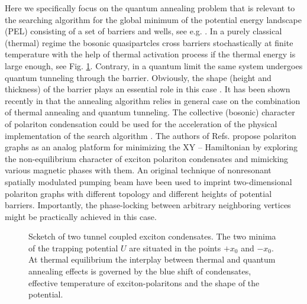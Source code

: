 \documentclass[fleqn,10pt]{wlscirep}
\begin{document}
Here we specifically focus on the quantum annealing problem that is relevant to the searching algorithm for the global minimum of the potential energy landscape (PEL) consisting of a set of barriers and wells, see e.g.  \cite{Santoro, Das}.
In a purely classical  (thermal) regime the {bosonic quasipartcles cross barriers stochastically} at finite temperature with the help of thermal activation process if the thermal energy is large enough, see Fig. \ref{pic:potential_picture}. Contrary, in a quantum limit the same system undergoes quantum tunneling through the barrier. Obviously, the shape (height and thickness) of the barrier plays an essential role in this case \cite{Das, Lewenstein}. It has been shown recently in \cite{Lewenstein} that the annealing algorithm relies in general case on the combination of thermal annealing and quantum tunneling. The     
collective (bosonic) character of polariton condensation could be used for the acceleration of the physical implementation of the search algorithm \cite{Yan}. The authors of Refs. \cite{Lago1, Lago2} propose polariton graphs as an analog platform for minimizing the XY -- Hamiltonian by exploring the non-equilibrium character of exciton polariton condensates and mimicking various magnetic phases with them.  An original technique of nonresonant spatially  modulated pumping beam  have been used to imprint two-dimensional polariton graphs with different topology and different heights of potential barriers. Importantly, the phase-locking  between arbitrary neighboring vertices might be practically achieved in this case.
%
\begin{figure}[ht]
\caption{Scketch of two tunnel coupled exciton condensates. The two minima of the trapping potential $U$ are situated in the points $+x_0$ and $-x_0$. At thermal equilibrium the interplay between thermal and quantum annealing effects is governed by the blue shift of condensates, effective temperature of exciton-polaritons and the shape of the potential. \label{pic:potential_picture}}
\end{figure} 
%
\end{document}
